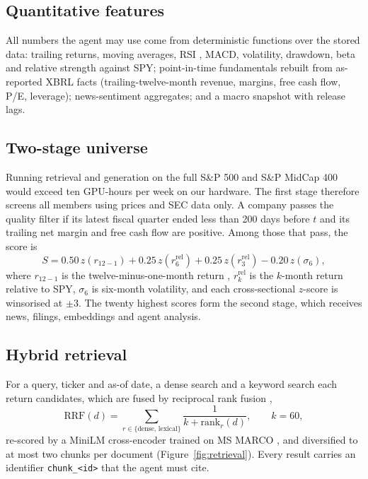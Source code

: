\documentclass[preprint,11pt]{elsarticle}
\newcommand{\code}[1]{\texttt{#1}}
\begin{document}
\subsection{Quantitative features}

All numbers the agent may use come from deterministic functions over the stored data: trailing returns,
moving averages, RSI \cite{wilder1978new}, MACD, volatility, drawdown, beta and relative strength against
SPY; point-in-time fundamentals rebuilt from as-reported XBRL facts (trailing-twelve-month revenue, margins,
free cash flow, P/E, leverage); news-sentiment aggregates; and a macro snapshot with release lags.

\subsection{Two-stage universe}
\label{sec:screen}

Running retrieval and generation on the full S\&P 500 and S\&P MidCap 400 would exceed ten GPU-hours per
week on our hardware. The first stage therefore screens all members using prices and SEC data only. A
company passes the quality filter if its latest fiscal quarter ended less than 200 days before $t$ and its
trailing net margin and free cash flow are positive. Among those that pass, the score is
\begin{equation}
  S = 0.50\, z\!\left(r_{12-1}\right) + 0.25\, z\!\left(r^{\mathrm{rel}}_{6}\right)
      + 0.25\, z\!\left(r^{\mathrm{rel}}_{3}\right) - 0.20\, z\!\left(\sigma_{6}\right),
  \label{eq:score}
\end{equation}
where $r_{12-1}$ is the twelve-minus-one-month return \cite{jegadeesh1993returns}, $r^{\mathrm{rel}}_{k}$ is
the $k$-month return relative to SPY, $\sigma_6$ is six-month volatility, and each cross-sectional $z$-score is
winsorised at $\pm 3$. The twenty highest scores form the second stage, which receives news, filings,
embeddings and agent analysis.

\subsection{Hybrid retrieval}
\label{sec:retrieval}

For a query, ticker and as-of date, a dense search and a keyword search each return candidates, which are
fused by reciprocal rank fusion \cite{cormack2009rrf},
\begin{equation}
  \mathrm{RRF}(d) = \sum_{r \in \{\text{dense},\,\text{lexical}\}} \frac{1}{k + \mathrm{rank}_r(d)}, \qquad k = 60,
  \label{eq:rrf}
\end{equation}
re-scored by a MiniLM cross-encoder trained on MS MARCO \cite{nogueira2019passage, bajaj2016marco}, and
diversified to at most two chunks per document (Figure~\ref{fig:retrieval}). Every result carries an
identifier \code{chunk\_<id>} that the agent must cite.
\end{document}
